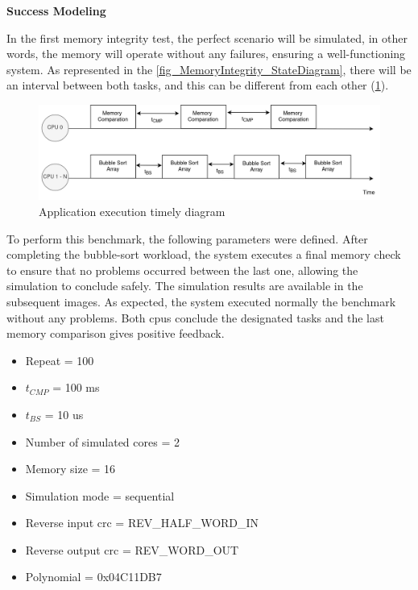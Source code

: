\textbf{Success Modeling}
\newline

In the first memory integrity test, the perfect scenario will be simulated, in other words, the memory will operate without any failures, 
ensuring a well-functioning system. As represented in the \autoref{fig_MemoryIntegrity_StateDiagram}, there will be an interval between both 
tasks, and this can be different from each other (\ref{fig_AppTimeDiagram}). 

\begin{figure}[H]
	\centering
 	\includegraphics[width=0.8\linewidth]{Images/AppTimeDiagram.png}
 	\caption{Application execution timely diagram}
	 \label{fig_AppTimeDiagram}
\end{figure}


To perform this benchmark, the following parameters were defined. After completing the bubble-sort workload, the system executes a final 
memory check to ensure that no problems occurred between the last one, allowing the simulation to conclude safely. The simulation results are 
available in the subsequent images. As expected, the system executed normally the benchmark without any problems. Both \glspl{cpu} conclude the 
designated tasks and the last memory comparison gives positive feedback. 

\hspace{1.5cm}

\begin{multicols}{2}
	
	\begin{itemize}
		\item Repeat = 100
		\item $t_{CMP}$ = 100 ms
		\item $t_{BS}$ = 10 us
		\item Number of simulated cores = 2
		\item Memory size = 16
	\end{itemize}

	\columnbreak

	\begin{itemize}
		\item Simulation mode = sequential
		\item Reverse input \gls{crc} = REV\_HALF\_WORD\_IN
		\item Reverse output \gls{crc} = REV\_WORD\_OUT
		\item Polynomial = 0x04C11DB7
	\end{itemize}

\end{multicols}


